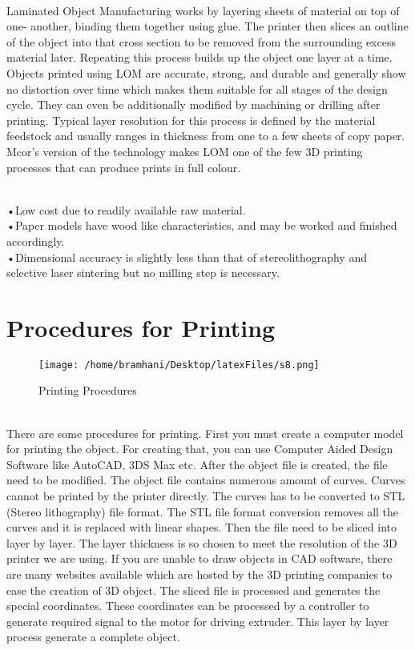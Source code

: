 \documentclass[12pt,a4paper]{report}
\begin{document}
	
	\indent
	\\Laminated Object Manufacturing works by layering sheets of material on top of one- another,
	binding them together using glue. The printer then slices an outline of the object into that cross
	section to be removed from the surrounding excess material later. Repeating this process builds up
	the object one layer at a time. Objects printed using LOM are accurate, strong, and durable and
	generally show no distortion over time which makes them suitable for all stages of the design cycle.
	They can even be additionally modified by machining or drilling after printing. Typical layer
	resolution for this process is defined by the material feedstock and usually ranges in thickness from
	one to a few sheets of copy paper. Mcor’s version of the technology makes LOM one of the few 3D
	printing processes that can produce prints in full colour.\par
	
	
	\indent
	\\		•Low cost due to readily available raw material.\\
	•Paper models have wood like characteristics, and may be worked and finished accordingly.\\
	•Dimensional accuracy is slightly less than that of stereolithography and selective laser
	sintering but no milling step is necessary.\\
	
	\par
	
	\chapter{Procedures for Printing}
	\setlength{\parindent}{10ex} 
	\begin{figure}[H]
		\centering
		\texttt{[image: /home/bramhani/Desktop/latexFiles/s8.png]}
		\label{fig:Printing Procedures}
		\caption{Printing Procedures}
	\end{figure}
	\indent
	\\There are some procedures for printing. First you must create a computer model for printing
	the object. For creating that, you can use Computer Aided Design Software like AutoCAD, 3DS
	Max etc. After the object file is created, the file need to be modified. The object file contains
	numerous amount of curves. Curves cannot be printed by the printer directly. The curves has to be
	converted to STL (Stereo lithography) file format. The STL file format conversion removes all the
	curves and it is replaced with linear shapes. Then the file need to be sliced into layer by layer. The
	layer thickness is so chosen to meet the resolution of the 3D printer we are using. If you are unable
	to draw objects in CAD software, there are many websites available which are hosted by the 3D
	printing companies to ease the creation of 3D object. The sliced file is processed and generates the
	special coordinates. These coordinates can be processed by a controller to generate required signal
	to the motor for driving extruder. This layer by layer process generate a complete object.\par
\end{document}
